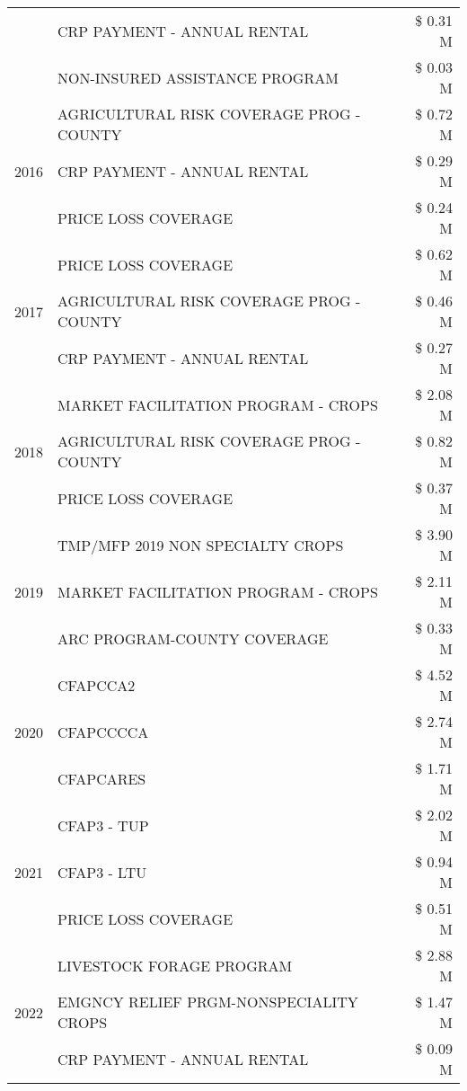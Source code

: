 \begin{tabular}{llr}
 & CRP PAYMENT - ANNUAL RENTAL & \$ 0.31 M \\
 & NON-INSURED ASSISTANCE PROGRAM & \$ 0.03 M \\
\cline{1-3}
\multirow[t]{3}{*}{2016} & AGRICULTURAL RISK COVERAGE PROG - COUNTY & \$ 0.72 M \\
 & CRP PAYMENT - ANNUAL RENTAL & \$ 0.29 M \\
 & PRICE LOSS COVERAGE & \$ 0.24 M \\
\cline{1-3}
\multirow[t]{3}{*}{2017} & PRICE LOSS COVERAGE & \$ 0.62 M \\
 & AGRICULTURAL RISK COVERAGE PROG - COUNTY & \$ 0.46 M \\
 & CRP PAYMENT - ANNUAL RENTAL & \$ 0.27 M \\
\cline{1-3}
\multirow[t]{3}{*}{2018} & MARKET FACILITATION PROGRAM - CROPS & \$ 2.08 M \\
 & AGRICULTURAL RISK COVERAGE PROG - COUNTY & \$ 0.82 M \\
 & PRICE LOSS COVERAGE & \$ 0.37 M \\
\cline{1-3}
\multirow[t]{3}{*}{2019} & TMP/MFP 2019 NON SPECIALTY CROPS & \$ 3.90 M \\
 & MARKET FACILITATION PROGRAM - CROPS & \$ 2.11 M \\
 & ARC PROGRAM-COUNTY COVERAGE & \$ 0.33 M \\
\cline{1-3}
\multirow[t]{3}{*}{2020} & CFAPCCA2 & \$ 4.52 M \\
 & CFAPCCCCA & \$ 2.74 M \\
 & CFAPCARES & \$ 1.71 M \\
\cline{1-3}
\multirow[t]{3}{*}{2021} & CFAP3 - TUP & \$ 2.02 M \\
 & CFAP3 - LTU & \$ 0.94 M \\
 & PRICE LOSS COVERAGE & \$ 0.51 M \\
\cline{1-3}
\multirow[t]{3}{*}{2022} & LIVESTOCK FORAGE PROGRAM & \$ 2.88 M \\
 & EMGNCY RELIEF PRGM-NONSPECIALITY CROPS & \$ 1.47 M \\
 & CRP PAYMENT - ANNUAL RENTAL & \$ 0.09 M \\
\cline{1-3}
\bottomrule
\end{tabular}
